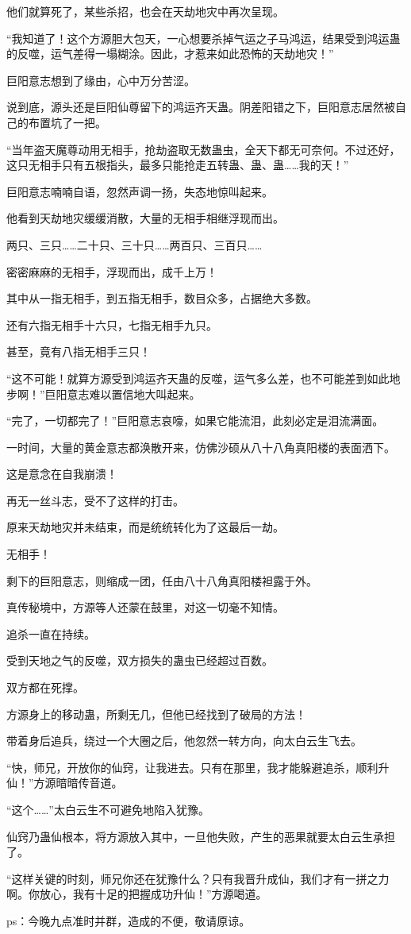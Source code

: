 \begin{this_body}
他们就算死了，某些杀招，也会在天劫地灾中再次呈现。

“我知道了！这个方源胆大包天，一心想要杀掉气运之子马鸿运，结果受到鸿运蛊的反噬，运气差得一塌糊涂。因此，才惹来如此恐怖的天劫地灾！”

巨阳意志想到了缘由，心中万分苦涩。

说到底，源头还是巨阳仙尊留下的鸿运齐天蛊。阴差阳错之下，巨阳意志居然被自己的布置坑了一把。

“当年盗天魔尊动用无相手，抢劫盗取无数蛊虫，全天下都无可奈何。不过还好，这只无相手只有五根指头，最多只能抢走五转蛊、蛊、蛊……我的天！”

巨阳意志喃喃自语，忽然声调一扬，失态地惊叫起来。

他看到天劫地灾缓缓消散，大量的无相手相继浮现而出。

两只、三只……二十只、三十只……两百只、三百只……

密密麻麻的无相手，浮现而出，成千上万！

其中从一指无相手，到五指无相手，数目众多，占据绝大多数。

还有六指无相手十六只，七指无相手九只。

甚至，竟有八指无相手三只！

“这不可能！就算方源受到鸿运齐天蛊的反噬，运气多么差，也不可能差到如此地步啊！”巨阳意志难以置信地大叫起来。

“完了，一切都完了！”巨阳意志哀嚎，如果它能流泪，此刻必定是泪流满面。

一时间，大量的黄金意志都涣散开来，仿佛沙硕从八十八角真阳楼的表面洒下。

这是意念在自我崩溃！

再无一丝斗志，受不了这样的打击。

原来天劫地灾并未结束，而是统统转化为了这最后一劫。

无相手！

剩下的巨阳意志，则缩成一团，任由八十八角真阳楼袒露于外。

真传秘境中，方源等人还蒙在鼓里，对这一切毫不知情。

追杀一直在持续。

受到天地之气的反噬，双方损失的蛊虫已经超过百数。

双方都在死撑。

方源身上的移动蛊，所剩无几，但他已经找到了破局的方法！

带着身后追兵，绕过一个大圈之后，他忽然一转方向，向太白云生飞去。

“快，师兄，开放你的仙窍，让我进去。只有在那里，我才能躲避追杀，顺利升仙！”方源暗暗传音道。

“这个……”太白云生不可避免地陷入犹豫。

仙窍乃蛊仙根本，将方源放入其中，一旦他失败，产生的恶果就要太白云生承担了。

“这样关键的时刻，师兄你还在犹豫什么？只有我晋升成仙，我们才有一拼之力啊。你放心，我有十足的把握成功升仙！”方源喝道。

ps：今晚九点准时并群，造成的不便，敬请原谅。

\end{this_body}

